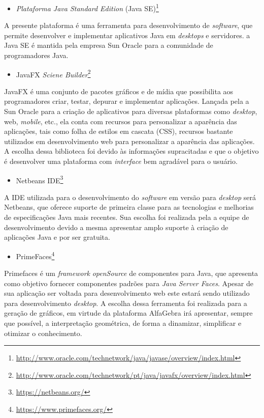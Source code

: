 \begin{itemize}
    \item \textit{Plataforma Java Standard Edition} (Java SE)\footnote[7]{\url{http://www.oracle.com/technetwork/java/javase/overview/index.html}}
\end{itemize}
\noindent A presente plataforma é uma ferramenta para desenvolvimento de \textit{software}, que permite desenvolver e implementar aplicativos Java em \textit{desktops} e servidores. a Java SE é mantida pela empresa Sun Oracle para a comunidade de programadores Java.

\begin{itemize}
    \item JavaFX \textit{Sciene Builder}\footnote[8]{\url{http://www.oracle.com/technetwork/pt/java/javafx/overview/index.html}}
\end{itemize}
\noindent JavaFX é uma conjunto de pacotes gráficos e de mídia que possibilita aos programadores criar, testar, depurar e implementar aplicações. Lançada pela a Sun Oracle para a criação de aplicativos para diversas plataformas como \textit{desktop}, web, \textit{mobile}, etc., ela conta com recursos para personalizar a aparência das aplicações, tais como folha de estilos em cascata (CSS), recursos bastante utilizados em desenvolvimento web para personalizar a aparência das aplicações. A escolha dessa biblioteca foi devido às informações supracitadas e que o objetivo é desenvolver uma plataforma com \textit{interface} bem agradável para o usuário.

\begin{itemize}
    \item Netbeans IDE\footnote[9]{\url{https://netbeans.org/}}
\end{itemize}
A IDE utilizada para o desenvolvimento do \textit{software} em versão para \textit{desktop} será Netbeans, que oferece suporte de primeira classe para as tecnologias e melhorias de especificações Java mais recentes. Sua escolha foi realizada pela a equipe de desenvolvimento devido a mesma apresentar amplo suporte à criação de aplicações Java e por ser gratuita.

\begin{itemize}
    \item PrimeFaces\footnote[10]{\url{https://www.primefaces.org/}}
\end{itemize}
Primefaces é um \textit{framework} \textit{openSource} de componentes para Java, que apresenta como objetivo fornecer componentes padrões para \textit{Java Server Faces}. Apesar de sua aplicação ser voltada para desenvolvimento web este estará sendo utilizado para desenvolvimento \textit{desktop}. A escolha dessa ferramenta foi realizada para a geração de gráficos, em virtude da plataforma AlfaGebra irá apresentar, sempre que possível, a interpretação geométrica, de forma a dinamizar, simplificar e otimizar o conhecimento.

